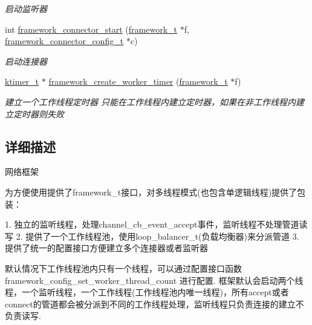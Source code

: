 \begin{DoxyCompactItemize}
\begin{DoxyCompactList}\small\item\em 启动监听器 \end{DoxyCompactList}\item 
int \hyperlink{a00103_ga4a6f0ed73c188faf4ed7e7d6050f6d5c_ga4a6f0ed73c188faf4ed7e7d6050f6d5c}{framework\+\_\+connector\+\_\+start} (\hyperlink{a00051_a6149d769f6f07ed14a40a271c95d8463_a6149d769f6f07ed14a40a271c95d8463}{framework\+\_\+t} $\ast$f, \hyperlink{a00051_a81253f4c995b97e69be0e67f7a26097f_a81253f4c995b97e69be0e67f7a26097f}{framework\+\_\+connector\+\_\+config\+\_\+t} $\ast$c)
\begin{DoxyCompactList}\small\item\em 启动连接器 \end{DoxyCompactList}\item 
\hyperlink{a00051_a846172ea4e8a86449eca41a3d8e074b7_a846172ea4e8a86449eca41a3d8e074b7}{ktimer\+\_\+t} $\ast$ \hyperlink{a00103_ga810b3d53d7116eebe3a725e2d4a873fa_ga810b3d53d7116eebe3a725e2d4a873fa}{framework\+\_\+create\+\_\+worker\+\_\+timer} (\hyperlink{a00051_a6149d769f6f07ed14a40a271c95d8463_a6149d769f6f07ed14a40a271c95d8463}{framework\+\_\+t} $\ast$f)
\begin{DoxyCompactList}\small\item\em 建立一个工作线程定时器 只能在工作线程内建立定时器，如果在非工作线程内建立定时器则失败 \end{DoxyCompactList}\end{DoxyCompactItemize}


\subsection{详细描述}
网络框架 


\begin{DoxyPre}
为方便使用提供了framework\_t接口，对多线程模式(也包含单逻辑线程)提供了包装：\end{DoxyPre}



\begin{DoxyPre}1. 独立的监听线程，处理channel\_cb\_event\_accept事件，监听线程不处理管道读写
2. 提供了一个工作线程池，使用loop\_balancer\_t(负载均衡器)来分派管道
3. 提供了统一的配置接口方便建立多个连接器或者监听器\end{DoxyPre}



\begin{DoxyPre}默认情况下工作线程池内只有一个线程，可以通过配置接口函数framework\_config\_set\_worker\_thread\_count
进行配置. 框架默认会启动两个线程，一个监听线程，一个工作线程(工作线程池内唯一线程)，所有accept或者
connect的管道都会被分派到不同的工作线程处理，监听线程只负责连接的建立不负责读写.\end{DoxyPre}



